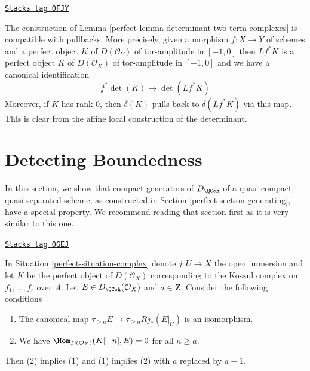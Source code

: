 \begin{remark}
\label{perfect-remark-functorial-det}
\href{https://stacks.math.columbia.edu/tag/0FJY}{\texttt{Stacks tag 0FJY}}

The construction of Lemma \ref{perfect-lemma-determinant-two-term-complexes}
is compatible with pullbacks. More precisely, given a morphism
$f : X \to Y$ of schemes and a perfect object $K$ of $D(\mathcal{O}_Y)$
of tor-amplitude in $[-1, 0]$ then $Lf^*K$ is a
perfect object $K$ of $D(\mathcal{O}_X)$
of tor-amplitude in $[-1, 0]$ and we have a canonical identification
$$
f^*\det(K) \longrightarrow \det(Lf^*K)
$$
Moreover, if $K$ has rank $0$, then $\delta(K)$ pulls back to
$\delta(Lf^*K)$ via this map. This is clear from the affine local
construction of the determinant.
\end{remark}

\section{Detecting Boundedness}
\label{perfect-section-detecting-boundedness}
In this section, we show that compact generators of $D_\QCoh$ of a
quasi-compact, quasi-separated scheme, as constructed in
Section \ref{perfect-section-generating}, have a special property.
We recommend reading that section first as it is very similar to this one.

\begin{lemma}
\label{perfect-lemma-orthogonal-koszul-first-variant}
\href{https://stacks.math.columbia.edu/tag/0GEJ}{\texttt{Stacks tag 0GEJ}}

In Situation \ref{perfect-situation-complex} denote $j : U \to X$ the open
immersion and let $K$ be the perfect object of $D(\mathcal{O}_X)$
corresponding to the Koszul complex on $f_1, \ldots, f_r$ over $A$.
Let $E \in D_\QCoh(\mathcal{O}_X)$ and $a \in \mathbf{Z}$.
Consider the following conditions
\begin{enumerate}
\item The canonical map $\tau_{\geq a}E \to \tau_{\geq a} Rj_*(E|_U)$
is an isomorphism.
\item We have $\Hom_{D(\mathcal{O}_X)}(K[-n], E) = 0$ for all $n \geq a$.
\end{enumerate}
Then (2) implies (1) and (1) implies (2) with $a$ replaced by $a + 1$.
\end{lemma}

